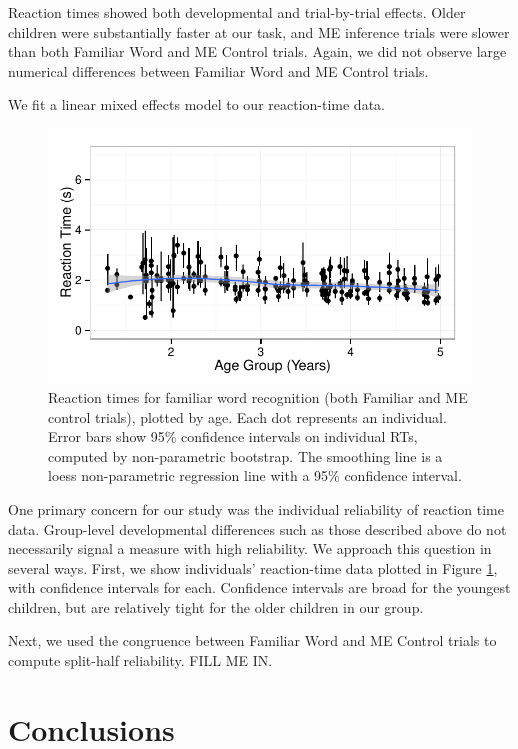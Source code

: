 \documentclass[man,noapacite]{apa2}
\begin{document}
Reaction times showed both developmental and trial-by-trial effects. Older children were substantially faster at our task, and ME inference trials were slower than both Familiar Word and ME Control trials. Again, we did not observe large numerical differences between Familiar Word and ME Control trials.

We fit a linear mixed effects model to our reaction-time data. 

\begin{figure}[t] 
  \begin{center} 
    \includegraphics[width=5in]{figures/individuals.pdf} 
    \caption{\label{fig:rt2} Reaction times for familiar word recognition (both Familiar and ME control trials), plotted by age. Each dot represents an individual. Error bars show 95\% confidence intervals on individual RTs, computed by non-parametric bootstrap. The smoothing line is a loess non-parametric regression line with a 95\% confidence interval.}
  \end{center} 
\end{figure}

One primary concern for our study was the individual reliability of reaction time data. Group-level developmental differences such as those described above do not necessarily signal a measure with high reliability. We approach this question in several ways. First, we show individuals' reaction-time data plotted in Figure \ref{fig:rt2}, with confidence intervals for each. Confidence intervals are broad for the youngest children, but are relatively tight for the older children in our group. 

Next, we used the congruence between Familiar Word and ME Control trials to compute split-half reliability. FILL ME IN. 

\section{Conclusions} 
\end{document}
